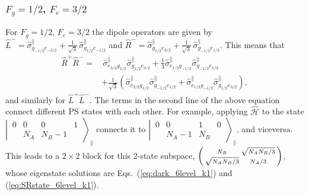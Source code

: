 \documentclass[aps,prx,superscriptaddress,twocolumn,notitlepage,nofootinbib,longbibliography]{revtex4-2}
\begin{document}
\subsubsection{\texorpdfstring{$F_g=1/2$, $F_e=3/2$}{Fg=1/2, Fe=3/2}}

For $F_g=1/2$, $F_e=3/2$ the dipole operators are given by $\hat{L}^-=\hat{\sigma}^\parallel_{g_{-1/2}e_{-3/2}} + \frac{1}{\sqrt{3}}\,\hat{\sigma}^\parallel_{g_{1/2}e_{-1/2}}$ and $\hat{R}^-=\hat{\sigma}^\parallel_{g_{1/2}e_{3/2}} + \frac{1}{\sqrt{3}}\,\hat{\sigma}^\parallel_{g_{-1/2}e_{1/2}}$. This means that
\begin{align}
    \hat{R}^+\hat{R}^- =&\, \hat{\sigma}^\parallel_{e_{3/2}g_{1/2}} \hat{\sigma}^\parallel_{g_{1/2}e_{3/2}} + \frac{1}{3} \hat{\sigma}^\parallel_{e_{1/2}g_{-1/2}} \hat{\sigma}^\parallel_{g_{-1/2}e_{1/2}}
\nonumber\\
    &+ \frac{1}{\sqrt{3}} \left( \hat{\sigma}^\parallel_{e_{3/2}g_{1/2}} \hat{\sigma}^\parallel_{g_{-1/2}e_{1/2}} + \hat{\sigma}^\parallel_{e_{1/2}g_{-1/2}} \hat{\sigma}^\parallel_{g_{1/2}e_{3/2}} \right),
\end{align}
and similarly for $\hat{L}^+\hat{L}^-$. The terms in the second line of the above equation connect different PS states with each other. For example, applying $\hat{\mathcal{H}}$ to the state $\left|\, \begin{smallmatrix} 0 & 0 & 0 & 1 \\  & N_A & N_B-1 &  \end{smallmatrix} \,\right\rangle_\parallel$ connects it to $\left|\, \begin{smallmatrix} 0 & 0 & 1 & 0 \\  & N_A-1 & N_B &  \end{smallmatrix} \,\right\rangle_\parallel$, and viceversa. This leads to a $2\times2$ block for this 2-state subspace, $\begin{psmallmatrix} N_B & \sqrt{N_AN_B/3} \\  \sqrt{N_AN_B/3} & N_A/3 \end{psmallmatrix}$, whose eigenstate solutions are Eqs.~(\ref{eq:dark_6level_k1}) and (\ref{eq:SRstate_6level_k1}).
\end{document}
